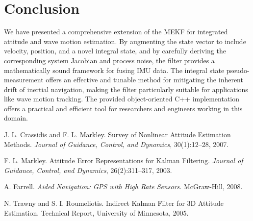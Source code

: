 \documentclass[11pt,letterpaper]{article}
\begin{document}
\section{Conclusion}
\label{sec:conclusion}
We have presented a comprehensive extension of the MEKF for integrated attitude and wave motion estimation. By augmenting the state vector to include velocity, position, and a novel integral state, and by carefully deriving the corresponding system Jacobian and process noise, the filter provides a mathematically sound framework for fusing IMU data. The integral state pseudo-measurement offers an effective and tunable method for mitigating the inherent drift of inertial navigation, making the filter particularly suitable for applications like wave motion tracking. The provided object-oriented C++ implementation offers a practical and efficient tool for researchers and engineers working in this domain.


\begin{thebibliography}{9}
J. L. Crassidis and F. L. Markley.
\newblock Survey of Nonlinear Attitude Estimation Methods.
\newblock \emph{Journal of Guidance, Control, and Dynamics}, 30(1):12--28, 2007.

F. L. Markley.
\newblock Attitude Error Representations for Kalman Filtering.
\newblock \emph{Journal of Guidance, Control, and Dynamics}, 26(2):311–317, 2003.

A. Farrell.
\newblock \emph{Aided Navigation: GPS with High Rate Sensors}.
\newblock McGraw-Hill, 2008.

N. Trawny and S. I. Roumeliotis.
\newblock Indirect Kalman Filter for 3D Attitude Estimation.
\newblock Technical Report, University of Minnesota, 2005.
\end{thebibliography}
\end{document}
